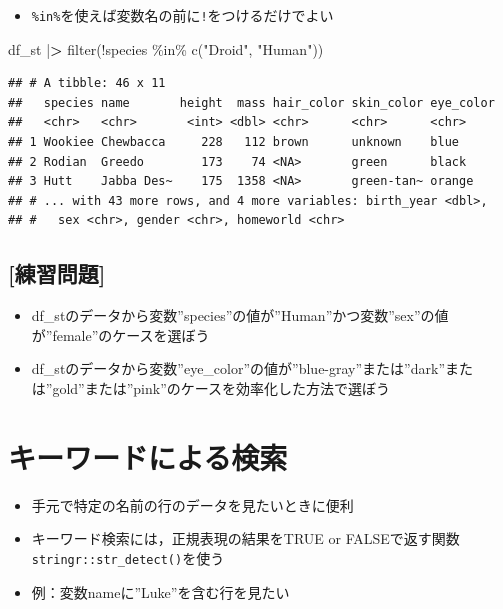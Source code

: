 \documentclass[
  xelatex,ja=standard, b5paper]{bxjsbook}
\newenvironment{Shaded}{\begin{snugshade}}{\end{snugshade}}
\newcommand{\ErrorTok}[1]{\textcolor[rgb]{0.64,0.00,0.00}{\textbf{#1}}}
\newcommand{\FunctionTok}[1]{\textcolor[rgb]{0.00,0.00,0.00}{#1}}
\newcommand{\NormalTok}[1]{#1}
\newcommand{\SpecialCharTok}[1]{\textcolor[rgb]{0.00,0.00,0.00}{#1}}
\newcommand{\StringTok}[1]{\textcolor[rgb]{0.31,0.60,0.02}{#1}}
\providecommand{\tightlist}{%
  \setlength{\itemsep}{0pt}\setlength{\parskip}{0pt}}
\begin{document}
\begin{itemize}
\tightlist
\item
  \texttt{\%in\%}を使えば変数名の前に\texttt{!}をつけるだけでよい
\end{itemize}

\begin{Shaded}
\begin{Highlighting}[]
\NormalTok{df\_st }\SpecialCharTok{|}\ErrorTok{\textgreater{}} 
  \FunctionTok{filter}\NormalTok{(}\SpecialCharTok{!}\NormalTok{species }\SpecialCharTok{\%in\%} \FunctionTok{c}\NormalTok{(}\StringTok{"Droid"}\NormalTok{, }\StringTok{"Human"}\NormalTok{))}
\end{Highlighting}
\end{Shaded}

\begin{verbatim}
## # A tibble: 46 x 11
##   species name       height  mass hair_color skin_color eye_color
##   <chr>   <chr>       <int> <dbl> <chr>      <chr>      <chr>    
## 1 Wookiee Chewbacca     228   112 brown      unknown    blue     
## 2 Rodian  Greedo        173    74 <NA>       green      black    
## 3 Hutt    Jabba Des~    175  1358 <NA>       green-tan~ orange   
## # ... with 43 more rows, and 4 more variables: birth_year <dbl>,
## #   sex <chr>, gender <chr>, homeworld <chr>
\end{verbatim}

\hypertarget{ux7df4ux7fd2ux554fux984c-7}{%
\subsection{{[}練習問題{]}}\label{ux7df4ux7fd2ux554fux984c-7}}

\begin{itemize}
\tightlist
\item
  df\_stのデータから変数''species''の値が''Human''かつ変数''sex''の値が''female''のケースを選ぼう
\item
  df\_stのデータから変数''eye\_color''の値が''blue-gray''または''dark''または''gold''または''pink''のケースを効率化した方法で選ぼう
\end{itemize}

\hypertarget{filter-kw}{%
\section{キーワードによる検索}\label{filter-kw}}

\begin{itemize}
\item
  手元で特定の名前の行のデータを見たいときに便利
\item
  キーワード検索には，正規表現の結果をTRUE or FALSEで返す関数\texttt{stringr::str\_detect()}を使う
\item
  例：変数nameに''Luke''を含む行を見たい
\end{itemize}
\end{document}
